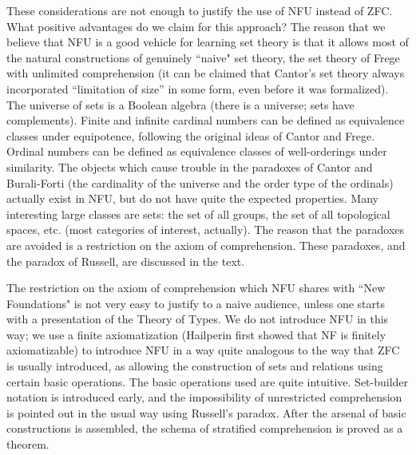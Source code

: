 These considerations are not enough to justify the use of NFU
instead of ZFC.  What positive
advantages do we claim for this approach?  The reason that we believe that
NFU is a good
vehicle for learning set theory is that it allows most of the natural
constructions of genuinely ``naive" set theory, the set theory of
Frege with unlimited comprehension (it can be claimed that
Cantor's set theory always incorporated ``limitation of size'' in some form,
even before it was formalized).  The universe of
sets is a 
Boolean algebra (there is a universe; sets
have complements).  Finite 
and infinite cardinal numbers can be defined as
equivalence classes
under equipotence, following the original ideas of Cantor and Frege.
Ordinal numbers can be defined as equivalence classes of
well-orderings under similarity.  The
objects which cause trouble in the paradoxes of Cantor and
Burali-Forti (the cardinality of the universe and the order type of the ordinals) actually exist in
NFU, but do not have quite the expected properties.  Many
interesting large classes are sets: the set of all groups,
the set of all topological spaces, etc.\mbox{} (most categories of interest,
actually).  The reason that the paradoxes are avoided is a restriction
on the axiom of comprehension.  These paradoxes, and the
paradox of Russell, are discussed in the text.

The restriction on the axiom of comprehension which
NFU shares with ``New Foundations" is not very easy to justify to a
naive audience, unless one starts with a presentation of the Theory of
Types.  We do not introduce NFU in this way; we use a
finite axiomatization (Hailperin first showed that NF is finitely
axiomatizable) to introduce NFU in a way quite analogous to
the way that ZFC is usually
introduced, as allowing the construction of sets and relations
using certain basic operations.
The basic operations used are quite intuitive.  Set-builder notation
is introduced early, and the impossibility of unrestricted
comprehension is pointed out in the usual way using
Russell's paradox.
After the arsenal of basic constructions is assembled, the schema of
stratified comprehension is proved
as a theorem.

